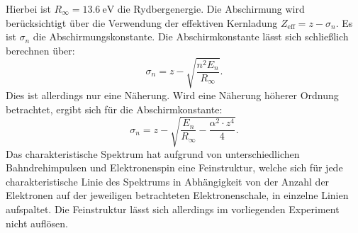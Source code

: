 Hierbei ist $R_\infty=\SI{13.6}{\electronvolt}$ die Rydbergenergie. Die Abschirmung wird berücksichtigt über die Verwendung der effektiven Kernladung $Z_\mathrm{eff}=z-\sigma_n$. Es ist $\sigma_n$ die Abschirmungskonstante.
Die Abschirmkonstante lässt sich schließlich berechnen über:
\begin{equation}
  \sigma_n=z-\sqrt{\frac{n^2 E_n}{R_\infty}} \text{.}
\end{equation}
Dies ist allerdings nur eine Näherung. Wird eine Näherung höherer Ordnung betrachtet, ergibt sich für die Abschirmkonstante:
\begin{equation}
  \sigma_n=z-\sqrt{\frac{E_n}{R_\infty}-\frac{\alpha^2\cdot z^4}{4}} \text{.}
\end{equation}
Das charakteristische Spektrum hat aufgrund von unterschiedlichen Bahndrehimpulsen und Elektronenspin eine Feinstruktur, welche sich für jede charakteristische Linie des Spektrums in Abhängigkeit von der Anzahl der Elektronen auf der jeweiligen betrachteten Elektronenschale, in einzelne Linien aufspaltet.
Die Feinstruktur lässt sich allerdings im vorliegenden Experiment nicht auflösen.

